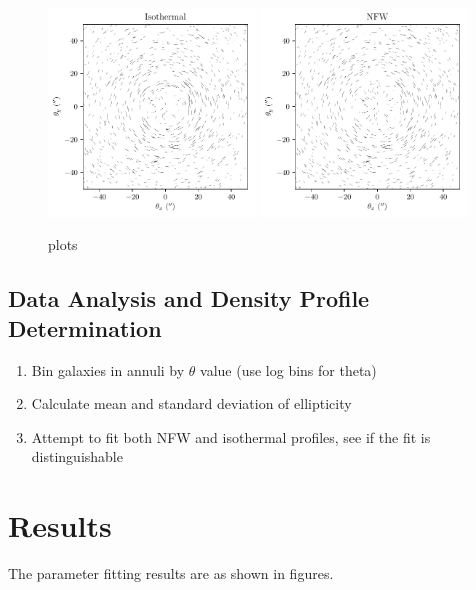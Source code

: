\documentclass[10pt]{article}
\begin{document}
\begin{figure}
    \centering
    \includegraphics[width=0.49\textwidth]{isothermalellipticities.pdf}
    \includegraphics[width=0.49\textwidth]{nfwellipticities.pdf}
    \caption{plots}
    \label{}
\end{figure}


\subsection{Data Analysis and Density Profile Determination}
\begin{enumerate}
\item Bin galaxies in annuli by $\theta$ value (use log bins for theta)
\item Calculate mean and standard deviation of ellipticity
\item Attempt to fit both NFW and isothermal profiles, see if the fit is distinguishable
\end{enumerate}



\section{Results}
The parameter fitting results are as shown in figures.
\end{document}
